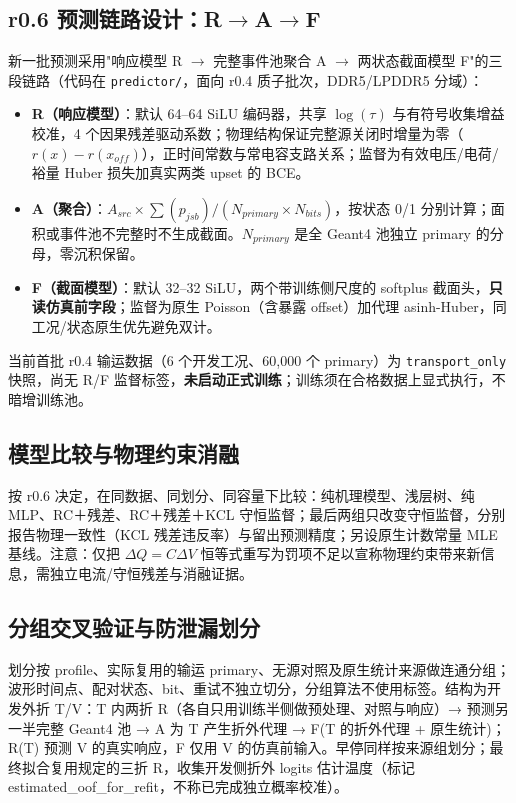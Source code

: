 \subsection{r0.6 预测链路设计：R$\rightarrow$A$\rightarrow$F}

新一批预测采用"响应模型 R $\rightarrow$ 完整事件池聚合 A $\rightarrow$ 两状态截面模型 F"的三段链路（代码在 \texttt{predictor/}，面向 r0.4 质子批次，DDR5/LPDDR5 分域）：

\begin{itemize}
  \item \textbf{R（响应模型）}：默认 64--64 SiLU 编码器，共享 $\log(\tau)$ 与有符号收集增益校准，4 个因果残差驱动系数；物理结构保证完整源关闭时增量为零（$r(x)-r(x_{off})$），正时间常数与常电容支路关系；监督为有效电压/电荷/裕量 Huber 损失加真实两类 upset 的 BCE。
  \item \textbf{A（聚合）}：$A_{src}\times\sum(p_{jsb})/(N_{primary}\times N_{bits})$，按状态 0/1 分别计算；面积或事件池不完整时不生成截面。$N_{primary}$ 是全 Geant4 池独立 primary 的分母，零沉积保留。
  \item \textbf{F（截面模型）}：默认 32--32 SiLU，两个带训练侧尺度的 softplus 截面头，\textbf{只读仿真前字段}；监督为原生 Poisson（含暴露 offset）加代理 asinh-Huber，同工况/状态原生优先避免双计。
\end{itemize}

当前首批 r0.4 输运数据（6 个开发工况、60,000 个 primary）为 \texttt{transport\_only} 快照，尚无 R/F 监督标签，\textbf{未启动正式训练}；训练须在合格数据上显式执行，不暗增训练池。

\subsection{模型比较与物理约束消融}

按 r0.6 决定，在同数据、同划分、同容量下比较：纯机理模型、浅层树、纯 MLP、RC＋残差、RC＋残差＋KCL 守恒监督；最后两组只改变守恒监督，分别报告物理一致性（KCL 残差违反率）与留出预测精度；另设原生计数常量 MLE 基线。注意：仅把 $\Delta Q=C\Delta V$ 恒等式重写为罚项不足以宣称物理约束带来新信息，需独立电流/守恒残差与消融证据。

\subsection{分组交叉验证与防泄漏划分}

划分按 profile、实际复用的输运 primary、无源对照及原生统计来源做连通分组；波形时间点、配对状态、bit、重试不独立切分，分组算法不使用标签。结构为开发外折 T/V：T 内两折 R（各自只用训练半侧做预处理、对照与响应）→ 预测另一半完整 Geant4 池 → A 为 T 产生折外代理 → F(T 的折外代理 + 原生统计)；R(T) 预测 V 的真实响应，F 仅用 V 的仿真前输入。早停同样按来源组划分；最终拟合复用规定的三折 R，收集开发侧折外 logits 估计温度（标记 estimated\_oof\_for\_refit，不称已完成独立概率校准）。

